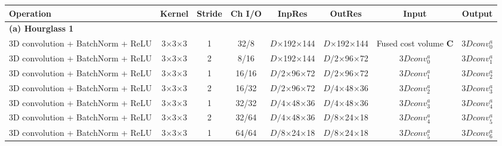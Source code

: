 \begin{table}[htbp]
\scriptsize
\centering
\begin{adjustbox}{width=1\textwidth}
\def\arraystretch{1.5}
\begin{tabular}{|l|c|c|c|c|c|c|c|}
\hline
\rowcolor{bgcolor}
\textbf{Operation}                     & \textbf{Kernel} & \textbf{Stride} & \textbf{Ch I/O} & \textbf{InpRes} & \textbf{OutRes} & \textbf{Input}     & \textbf{Output} \\ \hline
\hline
\rowcolor{bgcolor}
\textbf{(a) Hourglass 1} &                 &                 &                 &                 &                 &                    &                 \\ \hline
3D convolution + BatchNorm + ReLU                            & 3×3×3             & 1               & 32/8         & $D$×192×144           & $D$×192×144           & Fused cost volume $\textbf{C}$              & $3Dconv^a_0$          \\ \hline
3D convolution + BatchNorm + ReLU                             & 3×3×3             & 2               & 8/16         & $D$×192×144           & $D/2$×96×72           & $3Dconv^a_0$             & $3Dconv^a_1$          \\ \hline
3D convolution + BatchNorm + ReLU                             & 3×3×3             & 1               & 16/16         & $D/2$×96×72           & $D/2$×96×72           & $3Dconv^a_1$             & $3Dconv^a_2$          \\ \hline
3D convolution + BatchNorm + ReLU                             & 3×3×3             & 2               & 16/32         & $D/2$×96×72           & $D/4$×48×36           & $3Dconv^a_2$             & $3Dconv^a_3$          \\ \hline
3D convolution + BatchNorm + ReLU                             & 3×3×3             & 1               & 32/32         & $D/4$×48×36           & $D/4$×48×36            & $3Dconv^a_3$             & $3Dconv^a_4$          \\ \hline
3D convolution + BatchNorm + ReLU                             & 3×3×3             & 2               & 32/64        & $D/4$×48×36            & $D/8$×24×18             & $3Dconv^a_4$            & $3Dconv^a_5$          \\ \hline
3D convolution + BatchNorm + ReLU                             & 3×3×3             & 1               & 64/64       & $D/8$×24×18             & $D/8$×24×18            & $3Dconv^a_5$             & $3Dconv^a_6$          \\ \hline

\end{tabular}
\end{adjustbox}
\end{table}
